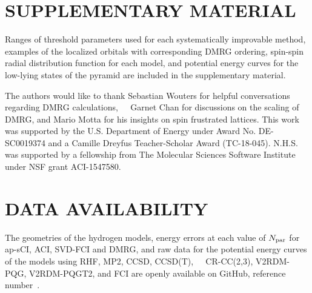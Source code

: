 \documentclass[aip,jcp,amsmath,amssymb, preprint]{revtex4-1}
\newcommand{\add}[1]{\colorbox{goodgreen}{\textcolor{white}{\footnotesize  \fontfamily{phv}\selectfont +}}
    \textcolor{goodgreen}{{#1}}\xspace}
\begin{document}
\section*{\label{sec:conclusions}SUPPLEMENTARY MATERIAL}
Ranges of threshold parameters used for each systematically improvable method, examples of the localized orbitals with corresponding DMRG ordering, spin-spin radial distribution function for each  model, and potential energy curves for the low-lying states of the  pyramid are included in the supplementary material.

\begin{acknowledgments}
The authors would like to thank Sebastian Wouters for helpful conversations regarding DMRG calculations, \add{Garnet Chan for discussions on the scaling of DMRG,} and Mario Motta for his insights on spin frustrated lattices. 
This work was supported by the U.S. Department of Energy under Award No. DE-SC0019374 and a Camille Dreyfus Teacher-Scholar Award (TC-18-045).
N.H.S. was supported by a fellowship from The Molecular Sciences Software Institute under NSF grant ACI-1547580.
\end{acknowledgments}

\section*{\label{sec:conclusions}DATA AVAILABILITY }
The geometries of the hydrogen models, energy errors at each value of $N_{\rm{par}}$ for ap-sCI, ACI, SVD-FCI and DMRG, and raw data for the potential energy curves of the  models using RHF, MP2, CCSD, CCSD(T), \add{CR-CC(2,3),} V2RDM-PQG, V2RDM-PQGT2, and FCI are openly available on GitHub, reference number~.


\end{document}
